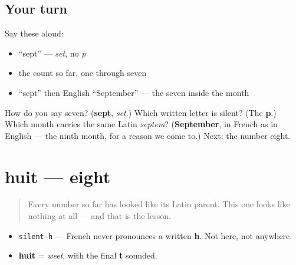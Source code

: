 \subsection*{Your turn}
Say these aloud:

\begin{itemize}
\raggedright
  \item \textquotedblleft{}sept\textquotedblright{} — \emph{set}, no \emph{p}
  \item the count so far, one through seven
  \item \textquotedblleft{}sept\textquotedblright{} then English \textquotedblleft{}September\textquotedblright{} — the seven inside the month
\end{itemize}

\begin{tcolorbox}[breakable,colback=teal!4,colframe=teal!35!black,title={Before you move on}]
How do you say seven? (\textbf{sept}, \emph{set}.) Which written letter is silent? (The \textbf{p}.) Which month carries the same Latin \emph{septem}? (\textbf{September}, in French as in English — the ninth month, for a reason we come to.) Next: the number eight.
\end{tcolorbox}
\section[huit]{huit — eight}

\label{lesson:FR-C06-huit}



\begin{quote}
Every number so far has looked like its Latin parent. This one looks like nothing at all — and that is the lesson.
\end{quote}

\begin{sounds}
\begin{itemize}
\raggedright
  \item \texttt{silent-h} — French never pronounces a written \textbf{h}. Not here, not anywhere.
  \item \textbf{huit} = \emph{weet}, with the final \textbf{t} sounded.
\end{itemize}
\end{sounds}

